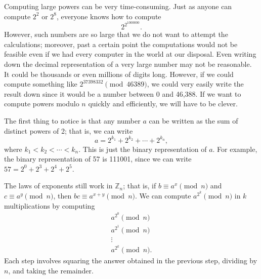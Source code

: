  
Computing large powers can be very time-consuming. Just as anyone can
compute $2^2$ or $2^8$, everyone knows how to compute
\[
2^{2^{1000000} }.
\]
However, such numbers are so large that we do not want to attempt the
calculations; moreover, past a certain point the computations would not
be feasible even if we had every computer in the world at our
disposal. Even 
writing down the decimal representation of a very large number may not
be reasonable. It could be thousands or even millions of digits long.
However, if we could compute something like $2^{37398332 } \pmod{
46389}$, we could very easily write the result down since it would be a
number between 0 and 46,388. If we want to compute powers modulo $n$
quickly and efficiently, we will have to be clever. 
 
 
The first thing to notice is that any number $a$ can be written as the
sum of distinct powers of 2; that is, we can write
\[
a = 2^{k_1} + 2^{k_2} + \cdots + 2^{k_n},
\]
where $k_1 < k_2 < \cdots < k_n$.  This is just the binary
representation of $a$. For example, the binary representation of 57 is
111001, since we can write $57 = 2^0 + 2^3 + 2^4 + 2^5$.
 
 
The laws of exponents still work in ${\mathbb Z}_n$; that is, if $b
\equiv a^x \pmod{ n}$ and $c \equiv a^y \pmod{ n}$, then $bc \equiv
a^{x+y} \pmod{ n}$. We can compute $a^{2^k} \pmod{ n}$ in $k$
multiplications by computing 
\begin{gather*}
a^{2^0} \pmod{ n} \\
a^{2^1} \pmod{ n }\\
\vdots \\
a^{2^k} \pmod{ n}.
\end{gather*}
Each step involves squaring the answer obtained in the previous step,
dividing by $n$, and taking the remainder.
 
